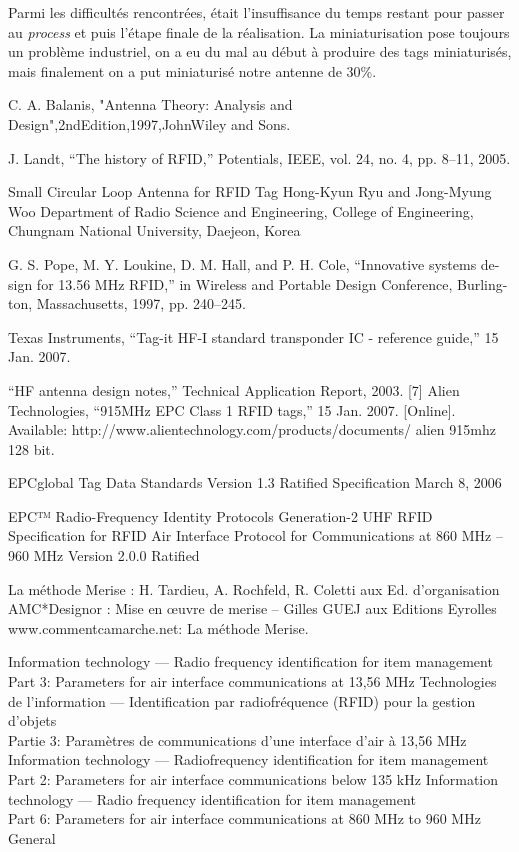 \documentclass[11pt, a4paper, twoside]{book}
\begin{document}
Parmi les difficultés rencontrées, était l'insuffisance du temps restant pour passer au \emph{process} et puis l'étape finale de la réalisation. La miniaturisation pose toujours un problème industriel, on a eu du mal au début à produire des tags miniaturisés, mais finalement on a put miniaturisé notre antenne de 30\%.\\

\begin{thebibliography}{9}

C. A. Balanis, "Antenna Theory: Analysis and
Design",2ndEdition,1997,JohnWiley and Sons.
 



  J. Landt, “The history of RFID,” Potentials, IEEE, vol. 24, no. 4, pp. 8–11, 2005.

 Small Circular Loop Antenna for RFID Tag
Hong-Kyun Ryu and Jong-Myung Woo
Department of Radio Science and Engineering, College of Engineering, Chungnam National University, Daejeon, Korea

 G. S. Pope, M. Y. Loukine, D. M. Hall, and P. H. Cole, “Innovative systems de- sign for 13.56 MHz RFID,” in Wireless and Portable Design Conference, Burling- ton, Massachusetts, 1997, pp. 240–245.

  Texas Instruments, “Tag-it HF-I standard transponder IC - reference guide,” 15 Jan. 2007. 

  “HF antenna design notes,” Technical Application Report, 2003.
[7] Alien Technologies, “915MHz EPC Class 1 RFID tags,” 15 Jan. 2007. [Online]. Available: http://www.alientechnology.com/products/documents/
alien 915mhz 128 bit.%

  EPCglobal Tag Data Standards Version 1.3 Ratified Specification
March 8, 2006

 EPC™ Radio-Frequency Identity Protocols Generation-2 UHF RFID
Specification for RFID Air Interface Protocol for Communications at 860 MHz – 960 MHz 
Version 2.0.0 Ratified

  La méthode Merise : H. Tardieu, A. Rochfeld, R. Coletti aux Ed. d’organisation
AMC*Designor : Mise en œuvre de merise – Gilles GUEJ aux Editions Eyrolles
www.commentcamarche.net: La méthode Merise. 

 Information technology — Radio frequency identification for item management\\
Part 3: Parameters for air interface communications at 13,56 MHz
Technologies de l'information — Identification par radiofréquence (RFID) pour la gestion d'objets \\
Partie 3: Paramètres de communications d'une interface d'air à
13,56 MHz 
Information technology — Radiofrequency identification for item management \\
Part 2:
Parameters for air interface
communications below 135 kHz 
Information technology — Radio
frequency identification for item
management\\
Part 6:
Parameters for air interface
communications at 860 MHz to 960 MHz
General 


\end{thebibliography}
\end{document}
